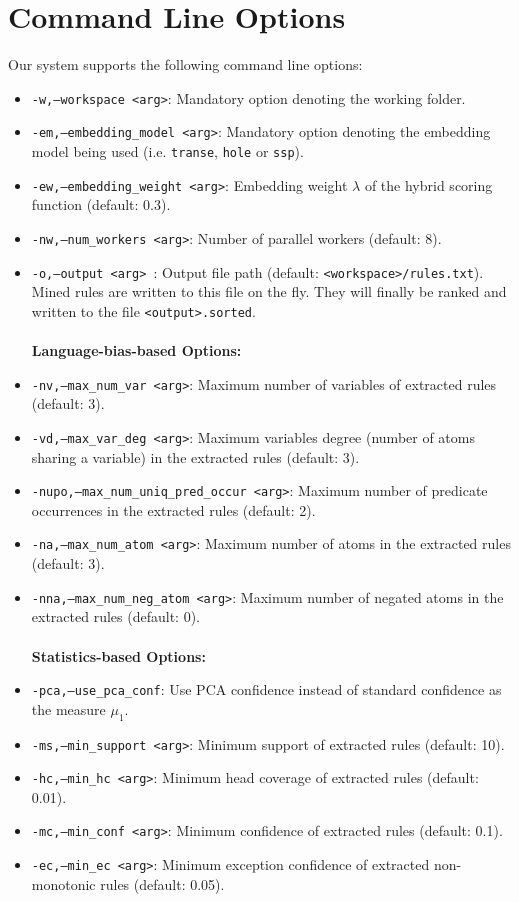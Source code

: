 \section{Command Line Options}
Our system supports the following command line options:
\begin{itemize}
\item \texttt{-w,--workspace <arg>}: Mandatory option denoting the working folder.
\item \texttt{-em,--embedding\_model <arg>}: Mandatory option denoting the embedding model being used (i.e. \texttt{transe}, \texttt{hole} or \texttt{ssp}).
\item \texttt{-ew,--embedding\_weight <arg>}: Embedding weight $\lambda$ of the hybrid scoring function (default: 0.3).
\item \texttt{-nw,--num\_workers <arg>}: Number of parallel workers (default: 8).
\item \texttt{-o,--output <arg> }: Output file path (default: \texttt{<workspace>/rules.txt}). Mined rules are written to this file on the fly. They will finally be ranked and written to the file \texttt{<output>.sorted}.
\\\\ \noindent \textbf{Language-bias-based Options:}
\item \texttt{-nv,--max\_num\_var <arg>}: Maximum number of variables of extracted rules (default: 3).
\item \texttt{-vd,--max\_var\_deg <arg>}: Maximum variables degree (number of atoms sharing a variable) in the extracted rules (default: 3).
\item \texttt{-nupo,--max\_num\_uniq\_pred\_occur <arg>}: Maximum number of predicate occurrences in the extracted rules (default: 2).
\item \texttt{-na,--max\_num\_atom <arg>}: Maximum number of atoms in the extracted rules (default: 3).
\item \texttt{-nna,--max\_num\_neg\_atom <arg>}: Maximum number of negated atoms in the extracted rules (default: 0).
\\\\ \noindent \textbf{Statistics-based Options:}
\item \texttt{-pca,--use\_pca\_conf}: Use PCA confidence instead of standard confidence as the measure $\mu_1$.
\item \texttt{-ms,--min\_support <arg>}: Minimum support of extracted rules (default: 10).
\item \texttt{-hc,--min\_hc <arg>}: Minimum head coverage of extracted rules (default: 0.01).
\item \texttt{-mc,--min\_conf <arg>}: Minimum confidence of extracted rules (default: 0.1).
\item \texttt{-ec,--min\_ec <arg>}: Minimum exception confidence of extracted non-monotonic rules (default: 0.05).
\end{itemize}

